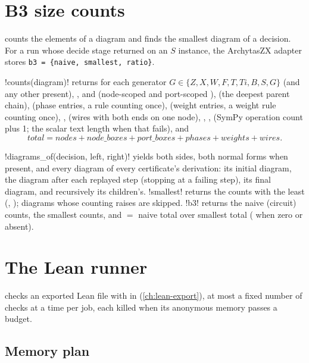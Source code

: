 \section{B3 size counts}\label{sec:bench-size}

 counts the elements of a diagram and finds the smallest diagram of a
decision. For a run whose decide stage returned  on an $S$ instance, the ArchytasZX
adapter stores \texttt{b3 = \{naive, smallest, ratio\}}.

\begin{definition}
\py!counts(diagram)! returns  for each generator $G\in\{Z, X, W, F, T, Ti, B, S,
G\}$ (and any other present), ,  and  (node-scoped
and port-scoped \bboxes),  (the deepest parent chain),  (phase
entries, a rule counting once),  (weight entries, a weight rule counting once),
,  (wires with both ends on one node), ,
,  (SymPy operation count plus 1; the scalar text length when
that fails), and
\[
  \mathit{total} = \mathit{nodes} + \mathit{node\_boxes} + \mathit{port\_boxes} + \mathit{phases}
  + \mathit{weights} + \mathit{wires}.
\]
\end{definition}

\py!diagrams_of(decision, left, right)! yields both sides, both normal forms when present, and
every diagram of every certificate's derivation: its initial diagram, the diagram after each
replayed step (stopping at a failing step), its final diagram, and recursively its children's.
\py!smallest! returns the counts with the least (, ); diagrams whose
counting raises are skipped. \py!b3! returns the naive (circuit) counts, the smallest counts, and
 $=$ naive total over smallest total ( when zero or absent).

\section{The Lean runner}\label{sec:bench-lean}

 checks an exported Lean file with  in
 (\cref{ch:lean-export}), at most a fixed number of checks at a time per job,
each killed when its anonymous memory passes a budget.

\subsection{Memory plan}

